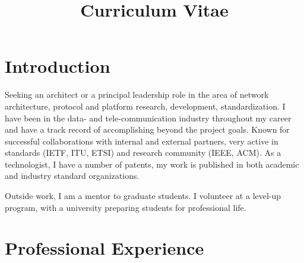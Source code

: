 \documentclass[11pt,a4paper,sans]{moderncv} %
\title{Curriculum Vitae}
\begin{document}
\makecvtitle %

\section{Introduction}
 {Seeking an architect or a principal leadership role in the area of network architecture, protocol and platform research, development, standardization.}
 {I have been in the data- and tele-communication industry  throughout my career and have a track record of accomplishing beyond the project goals. Known for successful collaborations with internal and external partners, very active in standards (IETF, ITU, ETSI) and research community (IEEE, ACM). \newline As a technologist, I have a number of patents, my work is published in both academic and industry standard organizations.} 

  { Outside work, I am a mentor to graduate students. I  volunteer at a level-up program, with a university  preparing students for professional life.}




  
\section{Professional Experience}
\end{document}
